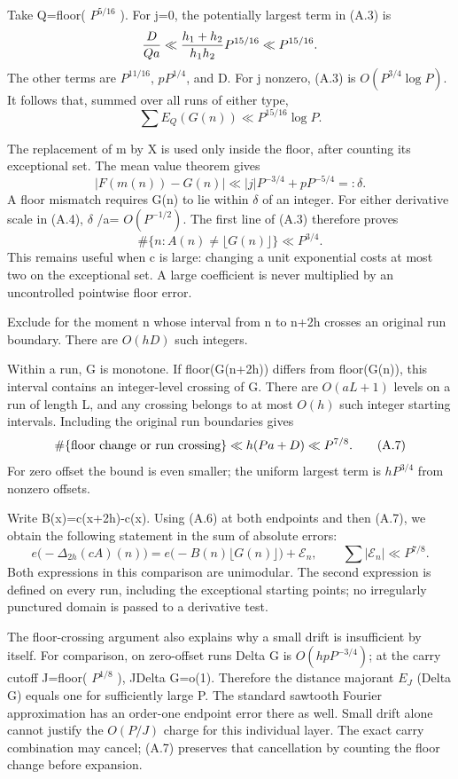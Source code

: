 \documentclass[11pt,a4paper]{article}
\begin{document}
Take Q=floor( \(P^{5/16}\) ). For j=0, the potentially largest term in
(A.3) is \[
{D\over Qa}\ll {h_1+h_2\over h_1h_2}P^{15/16}
\ll P^{15/16}.
\] The other terms are \(P^{11/16}\), \(pP^{1/4}\), and D. For j
nonzero, (A.3) is \(O(P^{3/4} \log P)\). It follows that, summed over
all runs of either type, \[
\sum E_Q(G(n))\ll P^{15/16}\log P. \tag{A.5}
\]

The replacement of m by X is used only inside the floor, after counting
its exceptional set. The mean value theorem gives \[
|F(m(n))-G(n)|
\ll |j|P^{-3/4}+pP^{-5/4}=:\delta.
\] A floor mismatch requires G(n) to lie within \(\delta\) of an
integer. For either derivative scale in (A.4), \(\delta\) /a=
\(O(P^{-1/2})\). The first line of (A.3) therefore proves \[
\#\{n:A(n)\ne\lfloor G(n)\rfloor\}\ll P^{3/4}. \tag{A.6}
\] This remains useful when c is large: changing a unit exponential
costs at most two on the exceptional set. A large coefficient is never
multiplied by an uncontrolled pointwise floor error.

Exclude for the moment n whose interval from n to n+2h crosses an
original run boundary. There are \(O(hD)\) such integers.

Within a run, G is monotone. If floor(G(n+2h)) differs from floor(G(n)),
this interval contains an integer-level crossing of G. There are
\(O(aL+1)\) levels on a run of length L, and any crossing belongs to at
most \(O(h)\) such integer starting intervals. Including the original
run boundaries gives \[
\#\{\hbox{floor change or run crossing}\}
\ll h(Pa+D)\ll P^{7/8}. \tag{A.7}
\] For zero offset the bound is even smaller; the uniform largest term
is \(hP^{3/4}\) from nonzero offsets.

Write B(x)=c(x+2h)-c(x). Using (A.6) at both endpoints and then (A.7),
we obtain the following statement in the sum of absolute errors: \[
e\bigl(-\Delta_{2h}(cA)(n)\bigr)
=e\bigl(-B(n)\lfloor G(n)\rfloor\bigr)+\mathcal E_n,
\qquad
\sum|\mathcal E_n|\ll P^{7/8}. \tag{A.8}
\] Both expressions in this comparison are unimodular. The second
expression is defined on every run, including the exceptional starting
points; no irregularly punctured domain is passed to a derivative test.

The floor-crossing argument also explains why a small drift is
insufficient by itself. For comparison, on zero-offset runs
\textbar Delta G\textbar{} is \(O(hpP^{-3/4})\); at the carry cutoff
J=floor( \(P^{1/8}\) ), J\textbar Delta G\textbar=o(1). Therefore the
distance majorant \(E_J\) (Delta G) equals one for sufficiently large P.
The standard sawtooth Fourier approximation has an order-one endpoint
error there as well. Small drift alone cannot justify the \(O(P/J)\)
charge for this individual layer. The exact carry combination may
cancel; (A.7) preserves that cancellation by counting the floor change
before expansion.
\end{document}
